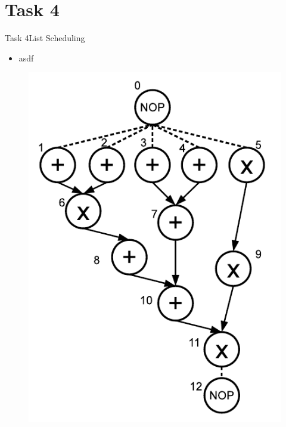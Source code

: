 
\section{Task 4}

\setcounter{task}{1}

\begin{frame}[allowframebreaks]{Task 4}{List Scheduling}
  \begin{tasknoinc}
    \begin{itemize}
      \item asdf
    \end{itemize}
    \begin{figure}
      \centering
      \includegraphics[height=0.6\paperheight]{./figures/task4_sequence_graph.png}
    \end{figure}
  \end{tasknoinc}
  \framebreak

\end{frame}
